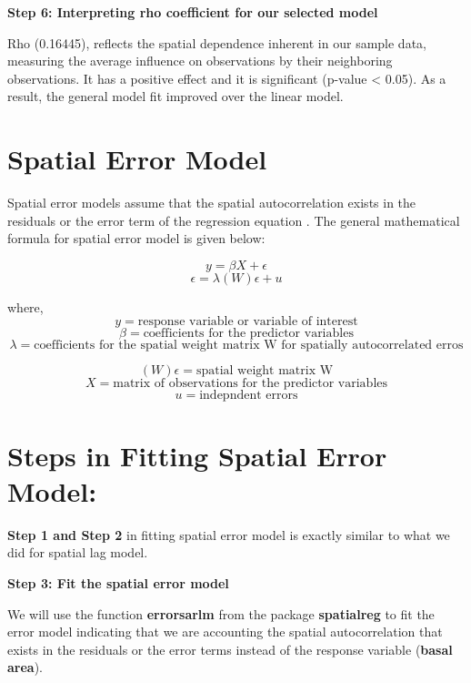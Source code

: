 \documentclass[
]{book}
\begin{document}
\textbf{Step 6: Interpreting rho coefficient for our selected model}

Rho (0.16445), reflects the spatial dependence inherent in our sample data, measuring the average influence on observations by their neighboring observations. It has a positive effect and it is significant (p-value \textless{} 0.05). As a result, the general model fit improved over the linear model.

\hypertarget{spatial-error-model}{%
\section{Spatial Error Model}\label{spatial-error-model}}

Spatial error models assume that the spatial autocorrelation exists in the residuals or the error term of the regression equation \citep{anselin_spatial_1998}. The general mathematical formula for spatial error model is given below:

\[ y=\beta X + \epsilon\]
\[\epsilon= \lambda (W)\epsilon+ u\]

where, \[y= \text{response variable or variable of interest}\]
\[\beta= \text{coefficients for the predictor variables}\]
\[\lambda= \text{coefficients for the spatial weight matrix W for spatially autocorrelated erros}\]

\[(W)\epsilon=\text{spatial weight matrix W}\]
\[X=\text{matrix of observations for the predictor variables}\]
\[u=\text{indepndent errors}\]

\hypertarget{steps-in-fitting-spatial-error-model}{%
\section{Steps in Fitting Spatial Error Model:}\label{steps-in-fitting-spatial-error-model}}

\textbf{Step 1 and Step 2} in fitting spatial error model is exactly similar to what we did for spatial lag model.

\textbf{Step 3: Fit the spatial error model}

We will use the function \textbf{errorsarlm} from the package \textbf{spatialreg} to fit the error model indicating that we are accounting the spatial autocorrelation that exists in the residuals or the error terms instead of the response variable (\textbf{basal area}).
\end{document}
